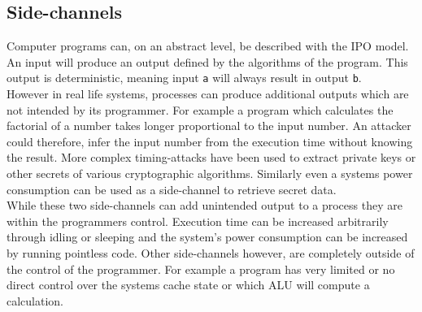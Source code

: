 \documentclass[conference,compsoc,final,a4paper]{IEEEtran}
\begin{document}
\subsection{Side-channels}
Computer programs can, on an abstract level, be described with the \ac{IPO} model. An input will produce an output defined by the algorithms
of the program. This output is deterministic, meaning input \lstinline|a| will always result in output \lstinline|b|. \\
However in real life systems, processes can produce additional outputs which are not intended by its programmer. For example a program which calculates the
factorial of a number takes longer proportional to the input number. An attacker could therefore, infer the input number from the execution time without knowing the
result. More complex timing-attacks have been used to extract private keys or other secrets
of various cryptographic algorithms. \cite{bernstein2005cache}\cite{kocher1996timing}
Similarly even a systems power consumption can be used as a side-channel to retrieve secret data. \cite{kocher1999differential} \\
While these two side-channels can add unintended output to a process they are within the programmers control. Execution time can be increased arbitrarily through
idling or sleeping and the system's power consumption can be increased by running pointless code. Other side-channels however, are completely outside of the
control of the programmer. For example a program has very limited or no direct control over the systems cache state or which \ac{ALU} will compute a calculation.
\end{document}
